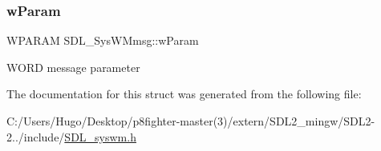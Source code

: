 \subsubsection{\texorpdfstring{w\+Param}{wParam}}
{\footnotesize\ttfamily W\+P\+A\+R\+AM S\+D\+L\+\_\+\+Sys\+W\+Mmsg\+::w\+Param}

W\+O\+RD message parameter 

The documentation for this struct was generated from the following file\+:\begin{DoxyCompactItemize}
\item 
C\+:/\+Users/\+Hugo/\+Desktop/p8fighter-\/master(3)/extern/\+S\+D\+L2\+\_\+mingw/\+S\+D\+L2-\/2../include/\hyperlink{_s_d_l__syswm_8h}{S\+D\+L\+\_\+syswm.\+h}\end{DoxyCompactItemize}
